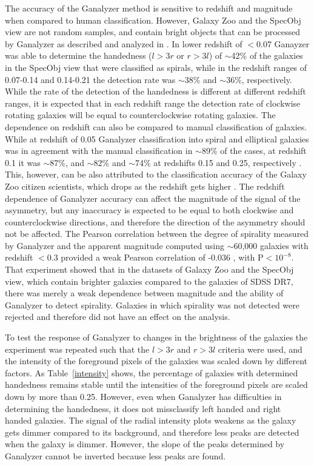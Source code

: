 \documentclass[times,twocolumn]{article}
\begin{document}
The accuracy of the Ganalyzer method is sensitive to redshift and magnitude when compared to human classification. However, Galaxy Zoo and the SpecObj view are not random samples, and contain bright objects that can be processed by Ganalyzer as described and analyzed in \citep{Sha11}. In lower redshift of $<$0.07 Ganayzer was able to determine the handedness ($l>3r$ or $r>3l$) of $\sim$42\% of the galaxies in the SpecObj view that were classified as spirals, while in the redshift ranges of 0.07-0.14 and 0.14-0.21 the detection rate was $\sim$38\% and $\sim$36\%, respectively. While the rate of the detection of the handedness is different at different redshift ranges, it is expected that in each redshift range the detection rate of clockwise rotating galaxies will be equal to counterclockwise rotating galaxies. The dependence on redshift can also be compared to manual classification of galaxies. While at redshift of 0.05 Ganalyzer classification into spiral and elliptical galaxies was in agreement with the manual classification in $\sim$89\% of the cases, at redshift 0.1 it was $\sim$87\%, and $\sim$82\% and $\sim$74\% at redshifts 0.15 and 0.25, respectively \citep{Sha11}. This, however, can be also attributed to the classification accuracy of the Galaxy Zoo citizen scientists, which drops as the redshift gets higher \citep{Lin10}. The redshift dependence of Ganalyzer accuracy \citep{Sha11,Doj13} can affect the magnitude of the signal of the asymmetry, but any inaccuracy is expected to be equal to both clockwise and counterclockwise directions, and therefore the direction of the asymmetry should not be affected. The Pearson correlation between the degree of spirality measured by Ganalyzer \citep{Sha11} and the apparent magnitude computed using $\sim$60,000 galaxies with redshift $<$0.3 provided a weak Pearson correlation of -0.036 \citep{Doj13}, with P$<10^{-8}$. That experiment showed that in the datasets of Galaxy Zoo and the SpecObj view, which contain brighter galaxies compared to the galaxies of SDSS DR7, there was merely a weak dependence between magnitude and the ability of Ganalyzer to detect spirality. Galaxies in which spirality was not detected were rejected and therefore did not have an effect on the analysis.

To test the response of Ganalyzer to changes in the brightness of the galaxies the experiment was repeated such that the $l>3r$ and $r>3l$ criteria were used, and the intensity of the foreground pixels of the galaxies was scaled down by different factors. As Table~\ref{intensity} shows, the percentage of galaxies with determined  handedness remains stable until the intensities of the foreground pixels are scaled down by more than 0.25. However, even when Ganalyzer has difficulties in determining the handedness, it does not missclassify left handed and right handed galaxies. The signal of the radial intensity plots weakens as the galaxy gets dimmer compared to its background, and therefore less peaks are detected when the galaxy is dimmer. However, the slope of the peaks determined by Ganalyzer \citep{Sha11} cannot be inverted because less peaks are found.
\end{document}
